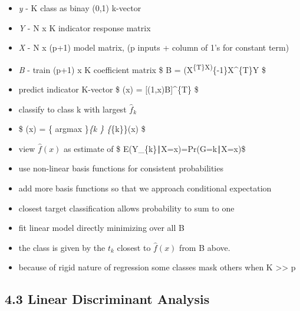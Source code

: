 \documentclass[11pt]{article}
\providecommand{\tightlist}{%
      \setlength{\itemsep}{0pt}\setlength{\parskip}{0pt}}
\begin{document}
\begin{itemize}
\tightlist
\item
  \emph{y} - K class as binay (0,1) k-vector
\item
  \emph{Y} - N x K indicator response matrix
\item
  \emph{X} - N x (p+1) model matrix, (p inputs + column of 1's for
  constant term)
\item
  \emph{B} - train (p+1) x K coefficient matrix \$ B =
  (X\textsuperscript{\{T\}X)}\{-1\}X\^{}\{T\}Y \$
\item
  predict indicator K-vector \$ (x) = {[}(1,x)B{]}\^{}\{T\} \$
\item
  classify to class k with largest \(\hat{f}_{k}\)
\item
  \$ (x) = \{ argmax \}\emph{\{k \in {} \}
  \{}\{k\}\}(x) \$
\item
  view \(\hat{f}(x)\) as estimate of \$ E(Y\_\{k\}∣X=x)=Pr(G=k∣X=x)\$
\item
  use non-linear basis functions for consistent probabilities
\item
  add more basis functions so that we approach conditional expectation
\item
  closest target classification allows probability to sum to one
\item
  fit linear model directly minimizing over all B
\item
  the class is given by the \(t_{k}\) closest to \(\hat{f}(x)\) from B
  above.\\
\item
  because of rigid nature of regression some classes mask others when K
  \textgreater{}\textgreater{} p
\end{itemize}

\subsection{4.3 Linear Discriminant
Analysis}\label{linear-discriminant-analysis}
\end{document}

